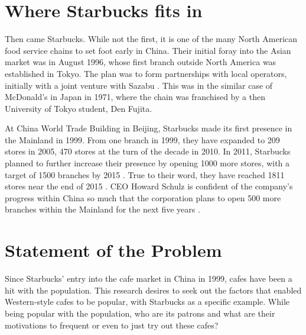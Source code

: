 
\section{Where Starbucks fits in}

Then came Starbucks. While not the first, it is one of the many North American
food service chains to set foot early in China. Their initial foray into the Asian
market was in August 1996, whose first branch outside North America was
established in Tokyo. The plan was to form partnerships with local operators,
initially with a joint venture with Sazabu \autocite{harrison_exporting_2005}.
This was in the similar case of McDonald's in Japan in 1971, where the chain was
franchised by a then University of Tokyo student, Den Fujita.
\autocite[21, 113]{watson_golden_2006}

At China World Trade Building in Beijing, Starbucks made its first presence in
the Mainland in 1999. From one branch in 1999, they have expanded to 209 stores
in 2005, 470 stores at the turn of the decade in 2010. In 2011, Starbucks
planned to further increase their presence by opening 1000 more stores, with a
target of 1500 branches by 2015 \autocite{_starbucks_2011}. True to their word,
they have reached 1811 stores near the end of 2015
\autocite{statista_starbucks_2015}. CEO Howard Schulz is confident of the
company's progress within China so much that the corporation plans to open 500
more branches within the Mainland for the next five years
\autocite{burkitt_starbucks_2016}.





\section{Statement of the Problem}

Since Starbucks' entry into the cafe market in China in 1999, cafes have been a
hit with the population. This research desires to seek out the factors that
enabled Western-style cafes to be popular, with Starbucks as a specific example.
While being popular with the population, who are its patrons and what are their
motivations to frequent or even to just try out these cafes?

